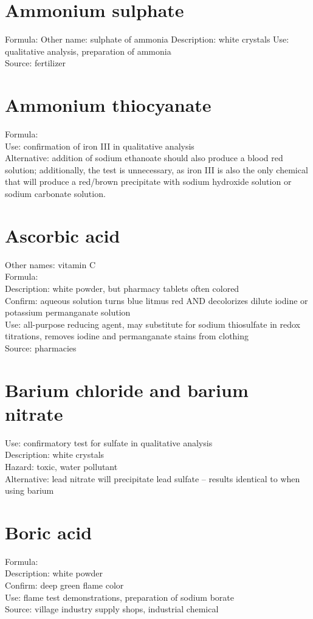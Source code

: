 \section{Ammonium sulphate}
Formula: 
Other name: sulphate of ammonia
Description: white crystals
Use: qualitative analysis, preparation of ammonia\\
Source: fertilizer

\section{Ammonium thiocyanate}
Formula: \\
Use: confirmation of iron III in qualitative analysis\\
Alternative: addition of sodium ethanoate 
should also produce a blood red solution; 
additionally, 
the test is unnecessary, 
as iron III is also the only chemical 
that will produce a red/brown precipitate with sodium hydroxide solution 
or sodium carbonate solution.

\section{Ascorbic acid}
Other names: vitamin C\\
Formula: \\
Description: white powder, 
but pharmacy tablets often colored\\
Confirm: aqueous solution turns blue litmus red 
AND decolorizes dilute iodine or potassium permanganate solution\\
Use: all-purpose reducing agent, 
may substitute for sodium thiosulfate in redox titrations, 
removes iodine and permanganate stains from clothing\\
Source: pharmacies

\section{Barium chloride and barium nitrate}
Use: confirmatory test for sulfate in qualitative analysis\\
Description: white crystals\\
Hazard: toxic, 
water pollutant\\
Alternative: lead nitrate will precipitate lead sulfate -- 
results identical to when using barium

\section{Boric acid}
Formula: \\
Description: white powder\\
Confirm: deep green flame color\\
Use: flame test demonstrations, preparation of sodium borate\\
Source: village industry supply shops, industrial chemical

